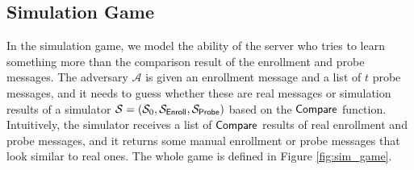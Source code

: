 \subsection{Simulation Game}
\label{sec:simulation_game}

In the simulation game, we model the ability of the server who tries to learn something more than the comparison result of the enrollment and probe messages. The adversary $\mathcal{A}$ is given an enrollment message and a list of $t$ probe messages, and it needs to guess whether these are real messages or simulation results of a simulator $\mathcal{S} = (\mathcal{S}_0, \mathcal{S}_{\sf Enroll}, \mathcal{S}_{\sf Probe})$ based on the $\sf Compare$ function. Intuitively, the simulator receives a list of $\sf Compare$ results of real enrollment and probe messages, and it returns some manual enrollment or probe messages that look similar to real ones. The whole game is defined in Figure \ref{fig:sim_game}.

